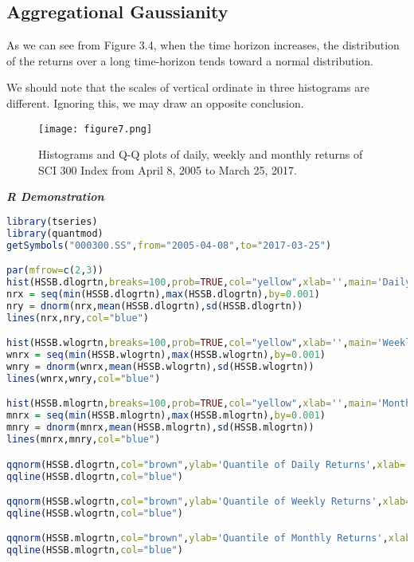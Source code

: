 \documentclass[paper=a4, fontsize=11pt]{scrartcl} %
\numberwithin{equation}{section} %
\numberwithin{figure}{section} %
\numberwithin{table}{section} %
\begin{document}
\subsection{Aggregational Gaussianity}

As we can see from Figure 3.4, when the time horizon increases, the distribution of the returns over a long time-horizon tends toward a normal distribution.\par
We should note that the scales of vertical ordinate in three histograms are different. Ignoring this, we may draw an opposite conclusion.

\begin{figure}[H]
  \centering
  \texttt{[image: figure7.png]}\\
  \caption{Histograms and Q-Q plots of daily, weekly and monthly returns of SCI 300 Index from April 8, 2005 to March 25, 2017.}
\end{figure}

\bigskip
\textbf{\textit{R Demonstration}}
\begin{lstlisting}[language=R]
library(tseries)
library(quantmod)
getSymbols("000300.SS",from="2005-04-08",to="2017-03-25")

par(mfrow=c(2,3))
hist(HSSB.dlogrtn,breaks=100,prob=TRUE,col="yellow",xlab='',main='Daily Returns')
nrx = seq(min(HSSB.dlogrtn),max(HSSB.dlogrtn),by=0.001)
nry = dnorm(nrx,mean(HSSB.dlogrtn),sd(HSSB.dlogrtn))
lines(nrx,nry,col="blue")

hist(HSSB.wlogrtn,breaks=100,prob=TRUE,col="yellow",xlab='',main='Weekly Returns')
wnrx = seq(min(HSSB.wlogrtn),max(HSSB.wlogrtn),by=0.001)
wnry = dnorm(wnrx,mean(HSSB.wlogrtn),sd(HSSB.wlogrtn))
lines(wnrx,wnry,col="blue")

hist(HSSB.mlogrtn,breaks=100,prob=TRUE,col="yellow",xlab='',main='Monthly Returns')
mnrx = seq(min(HSSB.mlogrtn),max(HSSB.mlogrtn),by=0.001)
mnry = dnorm(mnrx,mean(HSSB.mlogrtn),sd(HSSB.mlogrtn))
lines(mnrx,mnry,col="blue")

qqnorm(HSSB.dlogrtn,col="brown",ylab='Quantile of Daily Returns',xlab='Normal Quantile')
qqline(HSSB.dlogrtn,col="blue")

qqnorm(HSSB.wlogrtn,col="brown",ylab='Quantile of Weekly Returns',xlab='Normal Quantile')
qqline(HSSB.wlogrtn,col="blue")

qqnorm(HSSB.mlogrtn,col="brown",ylab='Quantile of Monthly Returns',xlab='Normal Quantile')
qqline(HSSB.mlogrtn,col="blue")
\end{lstlisting}
\end{document}
